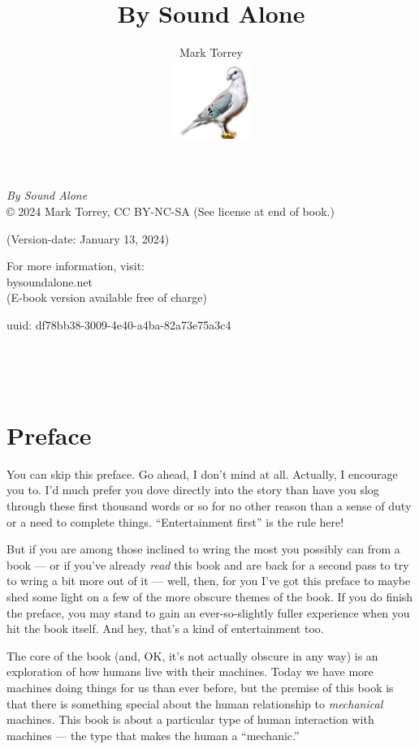 \documentclass[
]{scrbook}
\title{By Sound Alone}
\author{Mark Torrey\\[5mm] \includegraphics[width=1in]{../../cover/pigeon-logo.png}}
\date{}
\begin{document}
\frontmatter
\maketitle

\small
\clearpage
\emph{By Sound Alone}\\
© 2024 Mark Torrey, CC BY-NC-SA (See license at end of book.)

(Version-date: January 13, 2024)

For more information, visit:\\
bysoundalone.net\\
(E-book version available free of charge)

uuid: df78bb38-3009-4e40-a4ba-82a73e75a3c4
\clearpage

\mainmatter

\newpage

\ %

\newpage

\ %

\newpage

\hypertarget{preface}{%
\section{Preface}\label{preface}}

You can skip this preface. Go ahead, I don't mind at all. Actually, I
encourage you to. I'd much prefer you dove directly into the story than
have you slog through these first thousand words or so for no other
reason than a sense of duty or a need to complete things.
``Entertainment first'' is the rule here!

But if you are among those inclined to wring the most you possibly can
from a book --- or if you've already \emph{read} this book and are back
for a second pass to try to wring a bit more out of it --- well, then,
for you I've got this preface to maybe shed some light on a few of the
more obscure themes of the book. If you do finish the preface, you may
stand to gain an ever-so-slightly fuller experience when you hit the
book itself. And hey, that's a kind of entertainment too.

The core of the book (and, OK, it's not actually obscure in any way) is
an exploration of how humans live with their machines. Today we have
more machines doing things for us than ever before, but the premise of
this book is that there is something special about the human
relationship to \emph{mechanical} machines. This book is about a
particular type of human interaction with machines --- the type that
makes the human a ``mechanic.''
\end{document}
